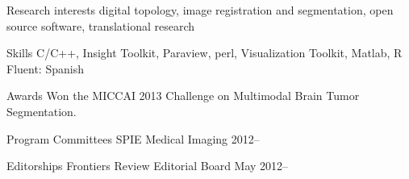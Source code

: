 \documentclass{resume}
\begin{document}

\begin{category}{Research interests}
   \citemnobullet
     digital topology, image registration and segmentation, open source software, translational research
\end{category}


\begin{category}{Skills}
\citemnobullet C/C++, Insight Toolkit, Paraview, perl, Visualization Toolkit, Matlab, R
\citemnobullet Fluent: Spanish
\end{category}


\begin{category}{Awards}
\citemnobullet Won the MICCAI 2013 Challenge on Multimodal Brain Tumor Segmentation.
\end{category}


\begin{category}{Program Committees}
\citemnobullet SPIE Medical Imaging 2012--
\end{category}


\begin{category}{Editorships}
\citemnobullet Frontiers Review Editorial Board May 2012--
\end{category}

\end{document}
